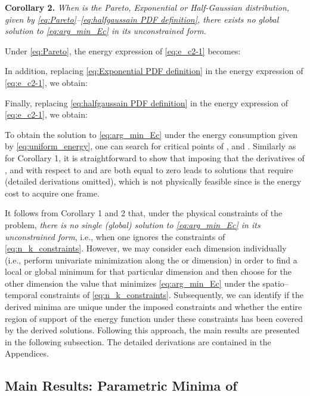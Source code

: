 \documentclass[twocolumn,english]{IEEEtran}
\theoremstyle{plain}
\theoremstyle{definition}
\begin{document}
\textbf{Corollary 2.}\emph{ When } \emph{is
the Pareto, Exponential or Half-Gaussian distribution, given by \eqref{eq:Pareto}--\eqref{eq:halfgaussain PDF definition},
there exists no global solution to \eqref{eq:arg_min_Ec} in its unconstrained
form.} 
\begin{IEEEproof}
Under \eqref{eq:Pareto}, the energy expression of \eqref{eq:e_c2-1}
becomes: 



In addition, replacing \eqref{eq:Exponential PDF definition} in the
energy expression of \eqref{eq:e_c2-1}, we obtain: 



Finally, replacing \eqref{eq:halfgaussain PDF definition} in the
energy expression of \eqref{eq:e_c2-1}, we obtain:




To obtain the solution to \eqref{eq:arg_min_Ec} under the energy
consumption given by \eqref{eq:uniform_energy}, one can search for
critical points of ,  and .
Similarly as for Corollary 1, it is straightforward to show that imposing
that the derivatives of ,  and 
with respect to  and  are both equal to zero leads to solutions
that require  (detailed derivations omitted), which is not physically
feasible since  is the energy cost to acquire one frame. 
\end{IEEEproof}
It follows from Corollary 1 and 2 that, under the physical constraints
of the problem, \emph{there is no single (global) solution 
to \eqref{eq:arg_min_Ec} in its unconstrained form}, i.e., when one
ignores the constraints of \eqref{eq:n_k_constraints}. However, we
may consider each dimension individually (i.e., perform univariate
minimization along the  or  dimension) in order to find a
local or global minimum for that particular dimension and then choose
for the other dimension the value that minimizes \eqref{eq:arg_min_Ec}
under the spatio--temporal constraints of \eqref{eq:n_k_constraints}.
Subsequently, we can identify if the derived minima are unique under
the imposed constraints and whether the entire region of support of
the energy function under these constraints has been covered by the
derived solutions. Following this approach, the main results are presented
in the following subsection. The detailed derivations are contained
in the Appendices.


\subsection{Main Results: Parametric Minima of  }
\end{document}
